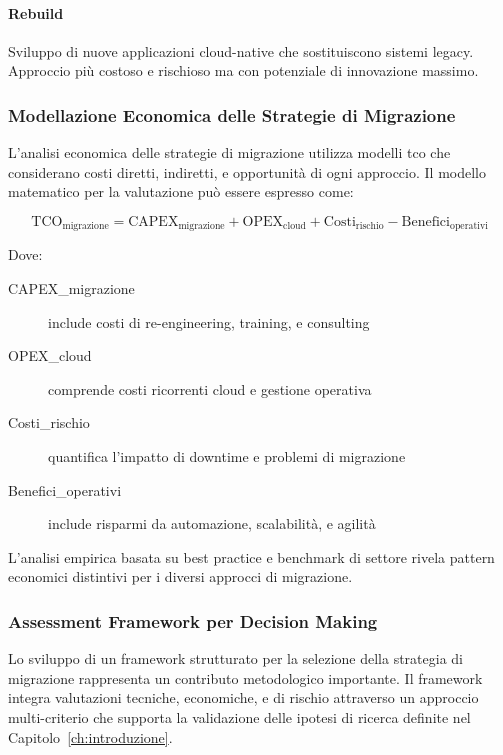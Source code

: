 \paragraph{Rebuild}
Sviluppo di nuove applicazioni cloud-native che sostituiscono sistemi legacy. Approccio più costoso e rischioso ma con potenziale di innovazione massimo.

\subsubsection{Modellazione Economica delle Strategie di Migrazione}

L'analisi economica delle strategie di migrazione utilizza modelli \gls{tco} che considerano costi diretti, indiretti, e opportunità di ogni approccio. Il modello matematico per la valutazione può essere espresso come:

\begin{equation}
\text{TCO}_{\text{migrazione}} = \text{CAPEX}_{\text{migrazione}} + \text{OPEX}_{\text{cloud}} + \text{Costi}_{\text{rischio}} - \text{Benefici}_{\text{operativi}}
\label{eq:tco-migrazione}
\end{equation}

Dove:
\begin{description}
    \item[CAPEX\_migrazione] include costi di re-engineering, training, e consulting
    \item[OPEX\_cloud] comprende costi ricorrenti cloud e gestione operativa
    \item[Costi\_rischio] quantifica l'impatto di downtime e problemi di migrazione
    \item[Benefici\_operativi] include risparmi da automazione, scalabilità, e agilità
\end{description}

L'analisi empirica basata su best practice e benchmark di settore rivela pattern economici distintivi per i diversi approcci di migrazione.

\subsubsection{Assessment Framework per Decision Making}

Lo sviluppo di un framework strutturato per la selezione della strategia di migrazione rappresenta un contributo metodologico importante. Il framework integra valutazioni tecniche, economiche, e di rischio attraverso un approccio multi-criterio che supporta la validazione delle ipotesi di ricerca definite nel Capitolo~\ref{ch:introduzione}.

